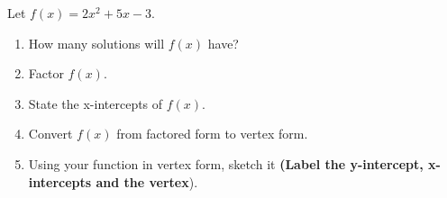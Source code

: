 \documentclass[12pt]{article} %
\begin{document}
\begin{qstn}
  Let $f(x) = 2x^2 + 5x - 3$.
  \begin{enumerate}[label=(\alph*)]
    \item How many solutions will $f(x)$ have?
    \item Factor $f(x)$.
    \item State the x-intercepts of $f(x)$.
    \item Convert $f(x)$ from factored form to vertex form.
    \item Using your function in vertex form, sketch it \textbf{(Label the y-intercept, x-intercepts and the vertex}).
  \end{enumerate}
\end{qstn}
\end{document}
